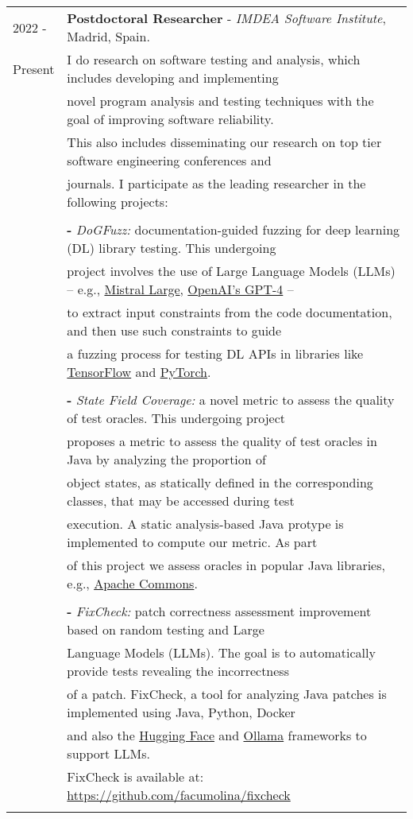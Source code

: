 \documentclass[a4paper,10pt]{article} %
\begin{document}
\begin{longtable}{ll}
\\
2022 - & \textbf{Postdoctoral Researcher} - \textit{IMDEA Software Institute}, Madrid, Spain. \\
Present & I do research on software testing and analysis, which includes developing and implementing \\ 
& novel program analysis and testing techniques with the goal of improving software reliability. \\ 
& This also includes disseminating our research on top tier software engineering conferences and \\ 
& journals. I participate as the leading researcher in the following projects: \\ & \\

& \textbf{-} \textit{DoGFuzz:} documentation-guided fuzzing for deep learning (DL) library testing. This undergoing \\ 
& project involves the use of Large Language Models (LLMs) -- e.g., \href{https://mistral.ai/news/mistral-large}{Mistral Large}, \href{https://openai.com/index/gpt-4/}{OpenAI's GPT-4} -- \\ 
& to extract input constraints from the code documentation, and then use such constraints to guide \\
& a fuzzing process for testing DL APIs in libraries like \href{https://www.tensorflow.org/}{TensorFlow} and \href{https://pytorch.org/}{PyTorch}. \\ & \\

& \textbf{-} \textit{State Field Coverage:} a novel metric to assess the quality of test oracles. This undergoing project  \\
& proposes a metric to assess the quality of test oracles in Java by analyzing the proportion of \\ 
& object states, as statically defined in the corresponding classes, that may be accessed during test \\ 
& execution. A static analysis-based Java protype is implemented to compute our metric. As part \\ 
& of this project we assess oracles in popular Java libraries, e.g., \href{https://commons.apache.org/}{Apache Commons}. \\ & \\

& \textbf{-} \textit{FixCheck:} patch correctness assessment improvement based on random testing and Large \\
& Language Models (LLMs). The goal is to automatically provide tests revealing the incorrectness \\ 
& of a patch. FixCheck, a tool for analyzing Java patches is implemented using Java, Python, Docker \\
& and also the \href{https://huggingface.co/}{Hugging Face} and \href{https://ollama.com/}{Ollama} frameworks to support LLMs. \\ 
& FixCheck is available at: \href{https://github.com/facumolina/fixcheck}{https://github.com/facumolina/fixcheck} \\ & \\


\end{longtable}
\end{document}
